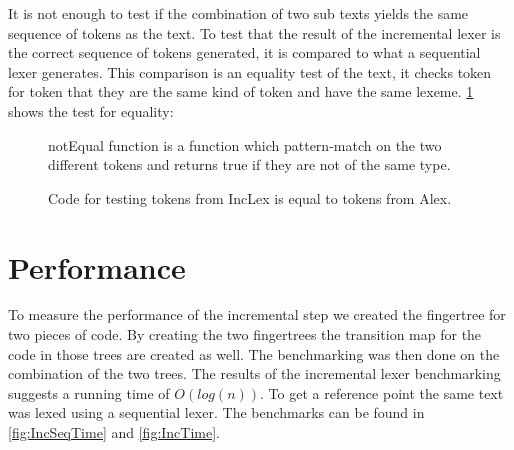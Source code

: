It is not enough to test if the combination of two sub texts yields the
same sequence of tokens as the text. To test that the result of the
incremental lexer is the correct sequence of tokens generated, it is compared to
what a sequential lexer generates. This comparison is an equality test of
the text, it checks token for token that they are the same kind of token and
have the same lexeme.
\cref{fig:CheckEquility} shows the test for equality:
\begin{figure}[h!]
  \centering
  
  notEqual function is a function which pattern-match on the two different
  tokens and returns true if they are not of the same type.
  \caption{Code for testing tokens from IncLex is equal to tokens from Alex. 
  \label{fig:CheckEquility}}
\end{figure} 

\section{Performance}
To measure the performance of the incremental step we created the fingertree for
two pieces of code. By creating the two fingertrees the transition map for the
code in those trees are created as well. The benchmarking was then done on the
combination of the two trees. The results of the incremental lexer benchmarking
suggests a running time of $O(log(n))$. To get a reference point the same text
was lexed using a sequential lexer. The benchmarks can be found in
\cref{fig:IncSeqTime} and \cref{fig:IncTime}.

